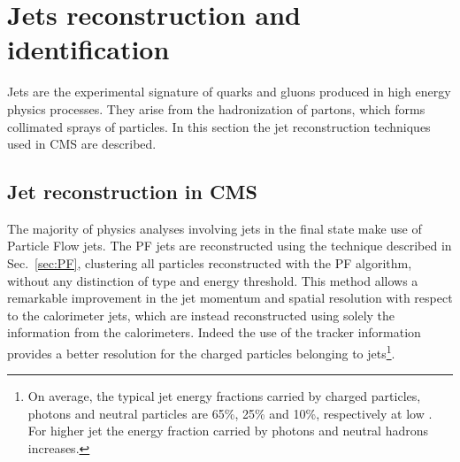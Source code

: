 \section{Jets reconstruction and identification}\label{sec:jets}

Jets are the experimental signature of quarks and gluons produced in high energy physics processes. They arise from the hadronization of partons, which forms collimated sprays of particles. In this section the jet reconstruction techniques used in CMS are described.

\subsection{Jet reconstruction in CMS}

The majority of physics analyses involving jets in the final state make use of Particle Flow jets. The PF jets are reconstructed using the technique described in Sec.~\ref{sec:PF}, clustering all particles reconstructed with the PF algorithm, without any distinction of type and energy threshold. This method allows a remarkable improvement in the jet momentum and spatial resolution with respect to the calorimeter jets, which are instead reconstructed using solely the information from the calorimeters. Indeed the use of the tracker information provides a better \pt resolution for the charged particles belonging to jets\footnote{On average, the typical jet energy fractions carried by charged particles, photons and neutral particles are 65\%, 25\% and 10\%, respectively at low \pt. For higher jet \pt the energy fraction carried by photons and neutral hadrons increases.}. 

